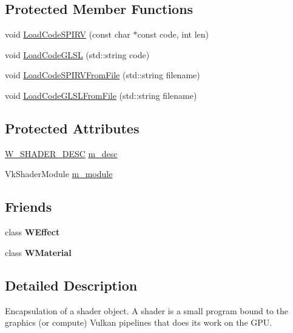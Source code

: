 \subsection*{Protected Member Functions}
\begin{DoxyCompactItemize}
\item 
void \hyperlink{class_w_shader_a63ad1afcf46d791088eecabf9c6622b0}{Load\+Code\+S\+P\+I\+RV} (const char $\ast$const code, int len)
\item 
void \hyperlink{class_w_shader_a29cffc471a569bbd669969feed3245d5}{Load\+Code\+G\+L\+SL} (std\+::string code)
\item 
void \hyperlink{class_w_shader_a53e2b763b3d9160eeb3712ddd315efd3}{Load\+Code\+S\+P\+I\+R\+V\+From\+File} (std\+::string filename)
\item 
void \hyperlink{class_w_shader_a027b08b66b2152f70889d95a37d8bf13}{Load\+Code\+G\+L\+S\+L\+From\+File} (std\+::string filename)
\end{DoxyCompactItemize}
\subsection*{Protected Attributes}
\begin{DoxyCompactItemize}
\item 
\hyperlink{struct_w___s_h_a_d_e_r___d_e_s_c}{W\+\_\+\+S\+H\+A\+D\+E\+R\+\_\+\+D\+E\+SC} \hyperlink{class_w_shader_a887bf7b5a672bcc901eb8999713d8cfe}{m\+\_\+desc}
\item 
Vk\+Shader\+Module \hyperlink{class_w_shader_a4fc9835e83eac6bcbc2c166c0d5b4ad1}{m\+\_\+module}
\end{DoxyCompactItemize}
\subsection*{Friends}
\begin{DoxyCompactItemize}
\item 
class {\bfseries W\+Effect}\hypertarget{class_w_shader_aa862ff89ea243967dcfdb12c12ad040b}{}\label{class_w_shader_aa862ff89ea243967dcfdb12c12ad040b}

\item 
class {\bfseries W\+Material}\hypertarget{class_w_shader_a82829be2ace0f839dd132dface8a4da3}{}\label{class_w_shader_a82829be2ace0f839dd132dface8a4da3}

\end{DoxyCompactItemize}


\subsection{Detailed Description}
Encapsulation of a shader object. A shader is a small program bound to the graphics (or compute) Vulkan pipelines that does its work on the G\+PU.

